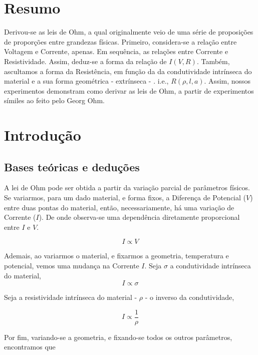 \documentclass[11pt]{article}
\date{\today}
\title{}
\begin{document}
\tableofcontents

\section{Resumo}
\label{sec:org03048d0}
Derivou-se as leis de Ohm, a qual originalmente veio de uma série de proposições de proporções entre grandezas físicas. Primeiro, considera-se a relação entre Voltagem e Corrente, apenas. Em sequência, as relações entre Corrente e Resistividade. Assim, deduz-se a forma da relação de \(I(V,R)\).  Também, ascultamos a forma da Resistência, em função da da condutividade intrínseca do material e a sua forma geométrica - extrínseca - . i.e., $R(\rho, l, a)$. Assim, nossos experimentos demonstram como derivar as leis de Ohm, a partir de experimentos símiles ao feito pelo Georg Ohm.

\section{Introdução}
\label{sec:org0fba29c}
\subsection{Bases teóricas e deduções}
\label{sec:orgbcdb80b}
A lei de Ohm pode ser obtida a partir da variação parcial de parâmetros físicos. Se variarmos, para um dado material, e forma fixos, a Diferença de Potencial (\(V\)) entre duas pontas do material, então, necessariamente, há uma variação de Corrente (\(I\)).  De onde observa-se uma dependência diretamente proporcional entre \(I\) e \(V\).

\begin{equation}
\label{eq:IV}
I \propto V
\end{equation}

Ademais, ao variarmos o material, e fixarmos a geometria, temperatura e potencial, vemos uma mudança na Corrente \(I\). Seja \(\sigma\) a condutividade intrínseca do material,
\begin{equation}
\label{eq:IV}
I \propto \sigma
\end{equation}

Seja a resistividade intrínseca do material - \(\rho\) - o inverso da condutividade,

\begin{equation}
\label{eq:IV}
I \propto \frac{1}{\rho}
\end{equation}

Por fim, variando-se a geometria, e fixando-se todos os outros parâmetros, encontramos que
\end{document}
